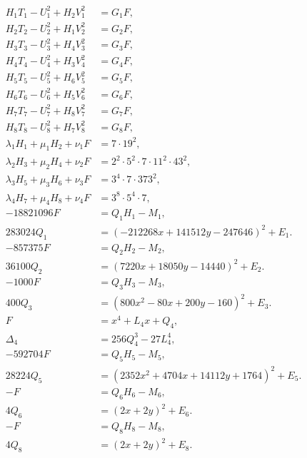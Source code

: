 \documentclass[11pt]{article}
\begin{document}
\begin{align}
H_{1}T_{1}-U_{1}^2+H_{2}V_{1}^2&=G_{1}F,\label{eq:norm1}\\
H_{2}T_{2}-U_{2}^2+H_{1}V_{2}^2&=G_{2}F,\label{eq:norm2}\\
H_{3}T_{3}-U_{3}^2+H_{4}V_{3}^2&=G_{3}F,\label{eq:norm3}\\
H_{4}T_{4}-U_{4}^2+H_{3}V_{4}^2&=G_{4}F,\label{eq:norm4}\\
H_{5}T_{5}-U_{5}^2+H_{6}V_{5}^2&=G_{5}F,\label{eq:norm5}\\
H_{6}T_{6}-U_{6}^2+H_{5}V_{6}^2&=G_{6}F,\label{eq:norm6}\\
H_{7}T_{7}-U_{7}^2+H_{8}V_{7}^2&=G_{7}F,\label{eq:norm7}\\
H_{8}T_{8}-U_{8}^2+H_{7}V_{8}^2&=G_{8}F,\label{eq:norm8}\\
\lambda_{1}H_{1}+\mu_{1}H_{2}+\nu_{1}F&=7\cdot 19^{2},\label{eq:cross1}\\
\lambda_{2}H_{3}+\mu_{2}H_{4}+\nu_{2}F&=2^{2}\cdot 5^{2}\cdot 7\cdot 11^{2}\cdot 43^{2},\label{eq:cross2}\\
\lambda_{3}H_{5}+\mu_{3}H_{6}+\nu_{3}F&=3^{4}\cdot 7\cdot 373^{2},\label{eq:cross3}\\
\lambda_{4}H_{7}+\mu_{4}H_{8}+\nu_{4}F&=3^{8}\cdot 5^{4}\cdot 7,\label{eq:cross4}\\
-18821096F&=Q_{1}H_{1}-M_{1},\label{eq:sign1}\\
283024Q_{1}&=(-212268x+141512y-247646)^2+E_{1}.\label{eq:sign1b}\\
-857375F&=Q_{2}H_{2}-M_{2},\label{eq:sign2}\\
36100Q_{2}&=(7220x+18050y-14440)^2+E_{2}.\label{eq:sign2b}\\
-1000F&=Q_{3}H_{3}-M_{3},\label{eq:sign3}\\
400Q_{3}&=(800x^{2}-80x+200y-160)^2+E_{3}.\label{eq:sign3b}\\
F&=x^4+L_{4}x+Q_{4},\label{eq:sign4}\\
\Delta_{4}&=256Q_{4}^3-27L_{4}^4,\label{eq:sign4b}\\
-592704F&=Q_{5}H_{5}-M_{5},\label{eq:sign5}\\
28224Q_{5}&=(2352x^{2}+4704x+14112y+1764)^2+E_{5}.\label{eq:sign5b}\\
-F&=Q_{6}H_{6}-M_{6},\label{eq:sign6}\\
4Q_{6}&=(2x+2y)^2+E_{6}.\label{eq:sign6b}\\
-F&=Q_{8}H_{8}-M_{8},\label{eq:sign8}\\
4Q_{8}&=(2x+2y)^2+E_{8}.\label{eq:sign8b}
\end{align}
\end{document}
